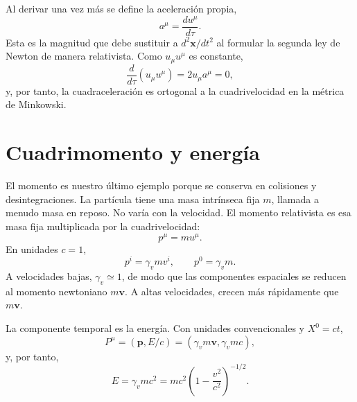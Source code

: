 \begin{classroomqa}\end{classroomqa}

Al derivar una vez más se define la aceleración propia,
\begin{equation}
a^\mu=\frac{du^\mu}{d\tau}.
\end{equation}
Esta es la magnitud que debe sustituir a \(d^2\mathbf x/dt^2\) al formular la segunda ley de Newton de manera relativista. Como \(u_\mu u^\mu\) es constante,
\begin{equation}
\frac{d}{d\tau}(u_\mu u^\mu)=2u_\mu a^\mu=0,
\end{equation}
y, por tanto, la cuadraceleración es ortogonal a la cuadrivelocidad en la métrica de Minkowski.

\section{Cuadrimomento y energía}

El momento es nuestro último ejemplo porque se conserva en colisiones y desintegraciones. La partícula tiene una masa intrínseca fija \(m\), llamada a menudo masa en reposo. No varía con la velocidad. El momento relativista es esa masa fija multiplicada por la cuadrivelocidad:
\begin{equation}
p^\mu=mu^\mu.
\label{eq:l5-four-momentum}
\end{equation}
En unidades \(c=1\),
\begin{equation}
p^i=\gamma_v m v^i,
\qquad
p^0=\gamma_v m.
\end{equation}
A velocidades bajas, \(\gamma_v\simeq1\), de modo que las componentes espaciales se reducen al momento newtoniano \(m\mathbf v\). A altas velocidades, crecen más rápidamente que \(m\mathbf v\).

La componente temporal es la energía. Con unidades convencionales y \(X^0=ct\),
\begin{equation}
P^\mu=(\mathbf p,E/c)
=(\gamma_v m\mathbf v,\gamma_v mc),
\end{equation}
y, por tanto,
\begin{equation}
E=\gamma_v mc^2
=mc^2\left(1-\frac{v^2}{c^2}\right)^{-1/2}.
\label{eq:l5-relativistic-energy}
\end{equation}

